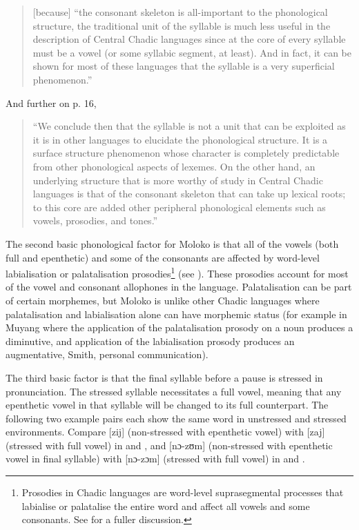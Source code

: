 \largerpage
\begin{quote}
[because] “the consonant skeleton is all-important to the phonological structure, the traditional unit of the syllable is much less useful in the description of Central Chadic languages since at the core of every syllable must be a vowel (or some syllabic segment, at least). And in fact, it can be shown for most of these languages that the syllable is a very superficial phenomenon.”
\end{quote}

And further on p. 16, 

\begin{quote}
“We conclude then that the syllable is not a unit that can be exploited as it is in other languages to elucidate the phonological  structure. It is a surface structure phenomenon whose character is completely predictable from other phonological aspects of lexemes. On the other hand, an underlying structure that is more worthy of study in Central Chadic languages is that of the consonant skeleton that can take up lexical roots; to this core are added other peripheral phonological elements such as vowels, prosodies, and tones.”
\end{quote}

The second basic phonological factor for Moloko is that all of the vowels (both full and epenthetic) and some of the consonants are affected by word-level labialisation or palatalisation prosodies\footnote{Prosodies in Chadic languages are word-level suprasegmental processes that labialise or palatalise the entire word and affect all vowels and some consonants. See \citet{Roberts2001} for a fuller discussion.} (see ). These prosodies account for most of the vowel and consonant allophones in the language. Palatalisation can be part of certain morphemes, but Moloko is unlike other Chadic languages where palatalisation and labialisation alone can have morphemic status (for example in Muyang where the application of the palatalisation prosody on a noun produces a diminutive, and application of the labialisation prosody produces an augmentative, Smith, personal communication).

The third basic factor is that the final syllable before a pause is stressed in pronunciation. The stressed syllable necessitates a full vowel, meaning that any epen\-the\-tic vowel in that syllable will be changed to its full counterpart.  The following two example pairs each show the same word in unstressed and stressed environments. Compare [zij] (non-stressed with epen\-the\-tic vowel) with [zaj] (stressed with full vowel) in  and , and [nɔ-zʊm] (non-stressed with epen\-the\-tic vowel in final syllable) with [nɔ-zɔm] (stressed with full vowel) in  and . 


